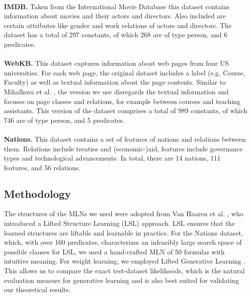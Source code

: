 \\
\noindent \textbf{IMDB.} Taken from the International Movie Database this dataset contains information about movies and their actors and directors. Also included are certain attributes like gender and work relations of actors and directors. The dataset has a total of 297 constants, of which 268 are of type person, and 6 predicates.\\
\\
\noindent \textbf{WebKB.} This dataset captures information about web pages from four US universities. For each web page, the original dataset \cite{craven2001} includes a label (e.g. Course, Faculty) as well as textual information about the page contents. Similar to Mihalkova et al. \cite{mihalkova2007}, the version we use disregards the textual information and focuses on page classes and relations, for example between courses and teaching assistants. This version of the dataset comprises a total of 989 constants, of which 746 are of type person, and 5 predicates.\\
\\
\noindent \textbf{Nations.} This dataset contains a set of features of nations and relations between them. Relations include treaties and (economic-)aid, features include governance types and technological advancements. In total, there are 14 nations, 111 features, and 56 relations.

\subsection{Methodology}

The structures of the MLNs we used were adopted from Van Haaren et al. \cite{vanHaaren2016}, who introduced a Lifted Structure Learning (LSL) approach. LSL ensures that the learned structures are liftable and learnable in practice. For the Nations dataset, which, with over 160 predicates, characterizes an infeasibly large search space of possible clauses for LSL, we used a hand-crafted MLN of 50 formulas with intuitive meaning. For weight learning, we employed Lifted Generative Learning \cite{vanHaaren2016}. This allows us to compare the exact test-dataset likelihoods, which is the natural evaluation measure for generative learning \cite{darwiche2009modeling,koller2009probabilistic,murphy2012machine,vanHaaren2016} and is also best suited for validating our theoretical results.

